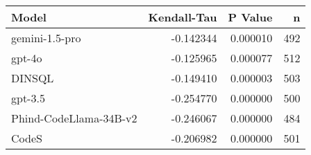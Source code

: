 \begin{tabular}{lrrr}
\toprule
Model & Kendall-Tau & P Value & n \\
\midrule
gemini-1.5-pro & -0.142344 & 0.000010 & 492 \\
gpt-4o & -0.125965 & 0.000077 & 512 \\
DINSQL & -0.149410 & 0.000003 & 503 \\
gpt-3.5 & -0.254770 & 0.000000 & 500 \\
Phind-CodeLlama-34B-v2 & -0.246067 & 0.000000 & 484 \\
CodeS & -0.206982 & 0.000000 & 501 \\
\bottomrule
\end{tabular}
